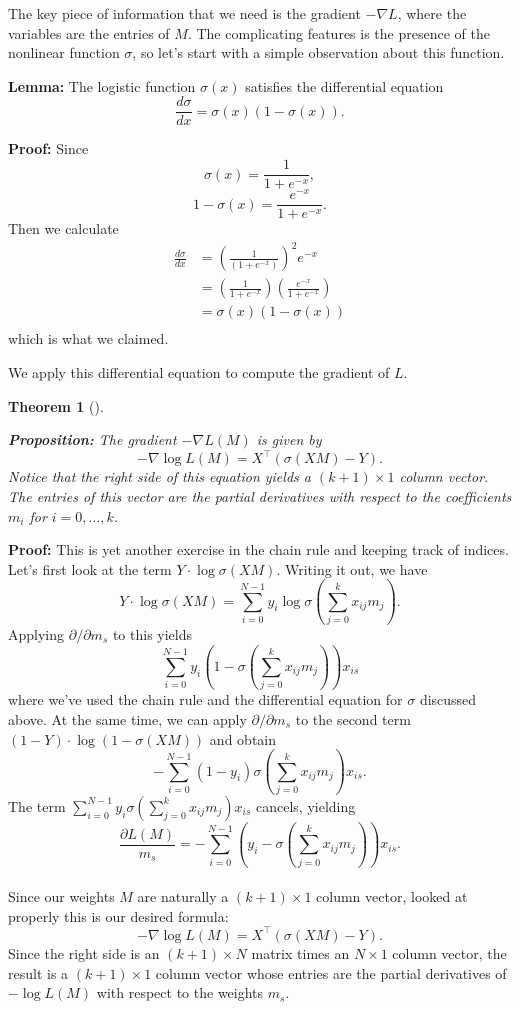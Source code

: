 \documentclass[
  11pt,
  letterpaper,
]{scrbook}
\theoremstyle{plain}
\theoremstyle{plain}
\newtheorem{theorem}{Theorem}[chapter]
\theoremstyle{remark}
\begin{document}
The key piece of information that we need is the gradient \(-\nabla L\),
where the variables are the entries of \(M\). The complicating features
is the presence of the nonlinear function \(\sigma\), so let's start
with a simple observation about this function.

\textbf{Lemma:} The logistic function \(\sigma(x)\) satisfies the
differential equation \[
\frac{d\sigma}{dx} = \sigma(x)(1-\sigma(x)).
\]

\textbf{Proof:} Since \[
\sigma(x)= \frac{1}{1+e^{-x}},
\] \[
1-\sigma(x) = \frac{e^{-x}}{1+e^{-x}}.
\] Then we calculate \[\begin{aligned}
\frac{d\sigma}{dx}&=\left(\frac{1}{(1+e^{-x})}\right)^2e^{-x} \\
                  &= \left(\frac{1}{1+e^{-x}}\right)\left(\frac{e^{-x}}{1+e^{-x}}\right)\\
                  &=\sigma(x)(1-\sigma(x)) \\
\end{aligned}
\] which is what we claimed.

We apply this differential equation to compute the gradient of \(L\).

\leavevmode{}%
\begin{theorem}[]\label{thm-logisticgradient}

\textbf{Proposition:} The gradient \(-\nabla L(M)\) is given by \[
-\nabla \log L(M) = X^{\intercal}(\sigma(XM)-Y).
\] Notice that the right side of this equation yields a
\((k+1)\times 1\) column vector. The entries of this vector are the
partial derivatives with respect to the coefficients \(m_{i}\) for
\(i=0,\ldots, k\).

\end{theorem}

\textbf{Proof:} This is yet another exercise in the chain rule and
keeping track of indices. Let's first look at the term
\(Y\cdot \log\sigma(XM)\). Writing it out, we have \[
Y\cdot \log\sigma(XM)=\sum_{i=0}^{N-1}y_{i}\log\sigma(\sum_{j=0}^{k}x_{ij}m_{j}).
\] Applying \(\partial/\partial m_{s}\) to this yields \[
\sum_{i=0}^{N-1}y_{i}(1-\sigma(\sum_{j=0}^{k}x_{ij}m_{j}))x_{is}
\] where we've used the chain rule and the differential equation for
\(\sigma\) discussed above. At the same time, we can apply
\(\partial/\partial m_{s}\) to the second term
\((1-Y)\cdot\log(1-\sigma(XM))\) and obtain \[
-\sum_{i=0}^{N-1}(1-y_{i})\sigma(\sum_{j=0}^{k}x_{ij}m_{j})x_{is}.
\] The term
\(\sum_{i=0}^{N-1} y_{i}\sigma(\sum_{j=0}^{k}x_{ij}m_{j})x_{is}\)
cancels, yielding \[
\frac{\partial L(M)}{m_{s}} = -\sum_{i=0}^{N-1} (y_{i}-\sigma(\sum_{j=0}^{k}x_{ij}m_{j}))x_{is}.
\]\\
Since our weights \(M\) are naturally a \((k+1)\times 1\) column vector,
looked at properly this is our desired formula: \[
-\nabla \log L(M) = X^{\intercal}(\sigma(XM)-Y).
\] Since the right side is an \((k+1)\times N\) matrix times an
\(N\times 1\) column vector, the result is a \((k+1)\times 1\) column
vector whose entries are the partial derivatives of \(-\log L(M)\) with
respect to the weights \(m_{s}\).
\end{document}
